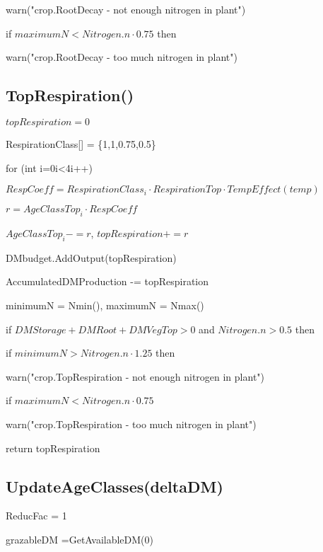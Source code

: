 \documentclass[%
]{scrartcl}
\begin{document}
   	\quad\quad	warn("crop.RootDecay - not enough nitrogen in plant")
   	
   	\quad  if $maximumN < Nitrogen.n  \cdot  0.75$ then 	

	 \quad\quad 	warn("crop.RootDecay - too much nitrogen in plant")
    
  





\subsection{TopRespiration()}
\citep[Eq. 11]{berntsen2005simulation}

   $topRespiration=0$



   RespirationClass[] = \{1,1,0.75,0.5\}      

	for (int i=0i<4i++)
   

   \quad   $RespCoeff = RespirationClass_i \cdot RespirationTop \cdot TempEffect(temp)$

   \quad   $r=AgeClassTop_i \cdot RespCoeff$

    \quad  $AgeClassTop_i -= r$,
    $topRespiration += r$
  
   DMbudget.AddOutput(topRespiration)

   AccumulatedDMProduction -= topRespiration

   minimumN = Nmin(), maximumN = Nmax()

   if $DMStorage + DMRoot + DMVegTop > 0 $
and $Nitrogen.n > 0.5$ then
  
   \quad if $minimumN > Nitrogen.n  \cdot  1.25$ then
   	

   \quad\quad   	warn("crop.TopRespiration - not enough nitrogen in plant")
   	
  \quad 	if $maximumN < Nitrogen.n  \cdot  0.75$
   	
 
\quad\quad	   	warn("crop.TopRespiration - too much nitrogen in plant")
   	
  

   return topRespiration



\subsection{UpdateAgeClasses(deltaDM)}



   ReducFac = 1

   grazableDM =GetAvailableDM(0)
\end{document}

